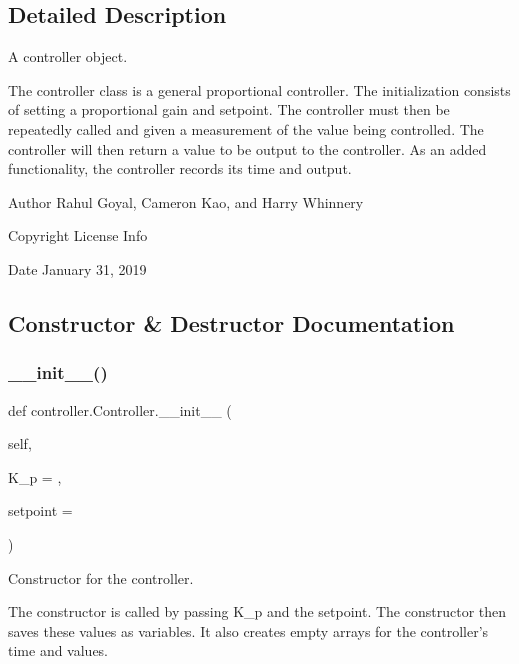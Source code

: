\subsection{Detailed Description}
A controller object. 

The controller class is a general proportional controller. The initialization consists of setting a proportional gain and setpoint. The controller must then be repeatedly called and given a measurement of the value being controlled. The controller will then return a value to be output to the controller. As an added functionality, the controller records its time and output. \begin{DoxyAuthor}{Author}
Rahul Goyal, Cameron Kao, and Harry Whinnery 
\end{DoxyAuthor}
\begin{DoxyCopyright}{Copyright}
License Info 
\end{DoxyCopyright}
\begin{DoxyDate}{Date}
January 31, 2019 
\end{DoxyDate}


\subsection{Constructor \& Destructor Documentation}
\mbox{\label{classcontroller_1_1_controller_a6a7ea9c3701a0d3fc752bd898c8fb2a3}} 
\subsubsection{\texorpdfstring{\+\_\+\+\_\+init\+\_\+\+\_\+()}{\_\_init\_\_()}}
{\footnotesize\ttfamily def controller.\+Controller.\+\_\+\+\_\+init\+\_\+\+\_\+ (\begin{DoxyParamCaption}\item[{}]{self,  }\item[{}]{K\+\_\+p = {},  }\item[{}]{setpoint = {} }\end{DoxyParamCaption})}



Constructor for the controller. 

The constructor is called by passing K\+\_\+p and the setpoint. The constructor then saves these values as variables. It also creates empty arrays for the controller’s time and values.


